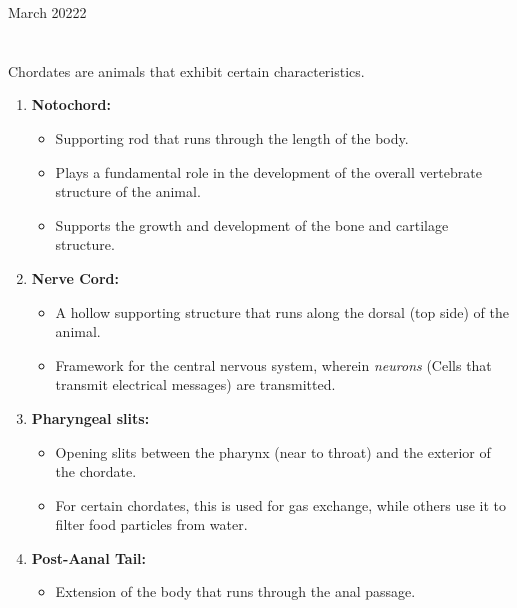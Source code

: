 \documentclass[12pt,oneside]{book} %
\begin{document}
	\renewcommand*{\term}{Term 2} %
	\renewcommand*{\coursecode}{MCR3U} %
	\renewcommand*{\coursename}{Course Name} %
	\renewcommand*{\thelecnum}{4} %
	\renewcommand*{\profname}{Prof Name} %
	\renewcommand*{\colink}{http://www.student.math.uwaterloo.ca/~c2kent} %
	\clearpage
	\pagestyle{classlecture}
\begin{lec}{March 20222}
	\chapter{\chapname\chaplec}

  
  Chordates are animals that exhibit certain characteristics. 

  \begin{enumerate}
    \item \textbf{Notochord:} 
      \begin{itemize}
        \item Supporting rod that runs through the length of the body. 
        \item Plays a fundamental role in the development of the overall vertebrate structure of the animal. 
        \item Supports the growth and development of the bone and cartilage structure.
      \end{itemize}    
    \item \textbf{Nerve Cord:}
      \begin{itemize}
        \item A hollow supporting structure that runs along the dorsal (top side) of the animal.
        \item Framework for the central nervous system, 
          wherein \textit{neurons} (Cells that transmit electrical messages) are transmitted.
      \end{itemize}
    \item \textbf{Pharyngeal slits:}
      \begin{itemize}
        \item Opening slits between the pharynx (near to throat) and the exterior of the chordate.   
        \item For certain chordates, this is used for gas exchange, while others use it to filter food particles from water.
      \end{itemize}
    \item \textbf{Post-Aanal Tail:} 
     \begin{itemize}
       \item Extension of the body that runs through the anal passage. 
     \end{itemize}
  \end{enumerate}


\end{lec}
\end{document}
